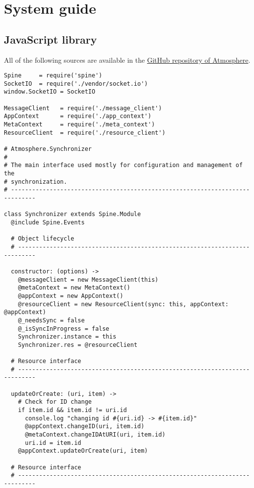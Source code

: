 \renewcommand{\thesection} {\Alph{section}}
\section{System guide}

\subsection{JavaScript library}

All of the following sources are available in the \href{https://github.com/vojto/atmos2}{GitHub repository of Atmosphere}.

\begin{lstlisting}[caption=synchronizer.coffee]
Spine     = require('spine')
SocketIO  = require('./vendor/socket.io')
window.SocketIO = SocketIO

MessageClient   = require('./message_client')
AppContext      = require('./app_context')
MetaContext     = require('./meta_context')
ResourceClient  = require('./resource_client')

# Atmosphere.Synchronizer
#
# The main interface used mostly for configuration and management of the
# synchronization.
# -----------------------------------------------------------------------------

class Synchronizer extends Spine.Module
  @include Spine.Events

  # Object lifecycle
  # ---------------------------------------------------------------------------
  
  constructor: (options) ->
    @messageClient = new MessageClient(this)
    @metaContext = new MetaContext()
    @appContext = new AppContext()
    @resourceClient = new ResourceClient(sync: this, appContext: @appContext)
    @_needsSync = false
    @_isSyncInProgress = false
    Synchronizer.instance = this
    Synchronizer.res = @resourceClient

  # Resource interface
  # ---------------------------------------------------------------------------

  updateOrCreate: (uri, item) ->
    # Check for ID change
    if item.id && item.id != uri.id
      console.log "changing id #{uri.id} -> #{item.id}"
      @appContext.changeID(uri, item.id)
      @metaContext.changeIDAtURI(uri, item.id)
      uri.id = item.id
    @appContext.updateOrCreate(uri, item)

  # Resource interface
  # ---------------------------------------------------------------------------


\end{lstlisting}
